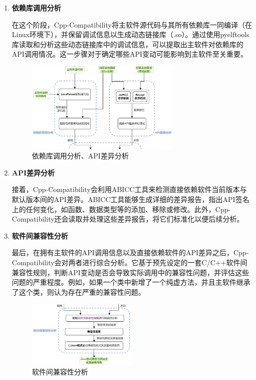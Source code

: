 \documentclass{article}
\begin{document}
\begin{enumerate}
	\item 
	\textbf{依赖库调用分析}
	
	在这个阶段，Cpp-Compatibility将主软件源代码与其所有依赖库一同编译（在Linux环境下），并保留调试信息以生成动态链接库（.so）。通过使用pyelftools库读取和分析这些动态链接库中的调试信息，可以提取出主软件对依赖库的API调用情况。这一步骤对于确定哪些API变动可能影响到主软件至关重要。
	
	\begin{figure}[H]
		\centering
		\includegraphics[width=0.7\textwidth]{img/3.png}
		\caption{依赖库调用分析、API差异分析}
	\end{figure}
	
	\item 
	\textbf{API差异分析}
	
	接着，Cpp-Compatibility会利用ABICC工具来检测直接依赖软件当前版本与默认版本间的API差异。ABICC工具能够生成详细的差异报告，指出API签名上的任何变化，如函数、数据类型等的添加、移除或修改。此外，Cpp-Compatibility还会读取并处理这些差异报告，将它们标准化以便后续分析。
	
	\item
	\textbf{软件间兼容性分析}
	
	最后，在拥有主软件的API调用信息以及直接依赖软件的API差异之后，Cpp-Compatibility会对两者进行综合分析。它基于预先设定的一套C/C++软件间兼容性规则，判断API变动是否会导致实际调用中的兼容性问题，并评估这些问题的严重程度。例如，如果一个类中新增了一个纯虚方法，并且主软件继承了这个类，则认为存在严重的兼容性问题。
	
	\begin{figure}[H]
		\centering
		\includegraphics[width=0.5\textwidth]{img/4.png}
		\caption{软件间兼容性分析}
	\end{figure}
\end{enumerate}
\end{document}
